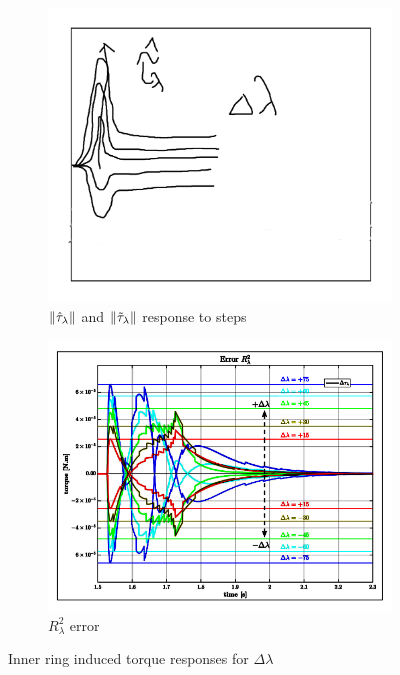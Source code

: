\begin{figure}[hbtp]
\centering
\begin{subfigure}{0.49\textwidth}
\centering
\includegraphics[width=\textwidth]{graphs/tau-lambda-hat}
\caption{$\left\lVert\hat{\tau}_\lambda\right\rVert$ and $\left\lVert\tilde{\tau}_\lambda\right\rVert$ response to steps}
\label{fig:tau-lambda-hat}
\end{subfigure}
\begin{subfigure}{0.49\textwidth}
\includegraphics[width=\textwidth]{graphs/tau-lambda-hat-r}
\caption{$R^2_\lambda$ error}
\label{fig:tau-lambda-hat-r}
\end{subfigure}
\caption{Inner ring induced torque responses for $\Delta\lambda$}
\vspace{-10pt}
\label{fig:tau-lambda-sim}
\vspace{-6pt}
\end{figure}

